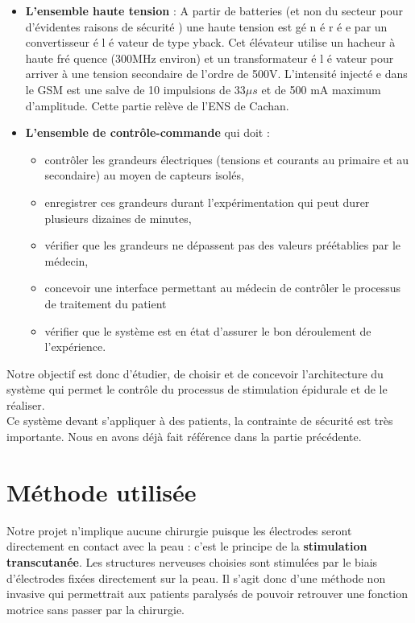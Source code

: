 \documentclass{report}
\begin{document}
\begin{itemize}
    \item \textbf{L'ensemble haute tension} : A partir de batteries (et non du secteur pour d'\'{e}videntes
raisons de s\'{e}curit\'{e} ) une haute tension est g\'{e} n \'{e} r \'{e} e par un convertisseur \'{e} l \'{e} vateur de
type yback. Cet \'{e}l\'{e}vateur utilise un hacheur \`{a} haute fr\'{e} quence (300MHz environ) et
un transformateur \'{e} l \'{e} vateur pour arriver \`{a} une tension secondaire de l'ordre de
500V. L'intensit\'{e} inject\'{e} e dans le GSM est une salve de 10 impulsions de 33$\mu s$ et de
500 mA maximum d'amplitude. Cette partie rel\`{e}ve de l'ENS de Cachan.
    
    \item \textbf{L'ensemble de contr\^{o}le-commande} qui doit :
   
    \begin{itemize}
        \item contr\^oler les grandeurs \'electriques (tensions et courants au primaire et au secondaire) au moyen de 
capteurs isol\'es,
        \item enregistrer ces grandeurs durant l'exp\'erimentation qui peut durer plusieurs dizaines de minutes,
        \item v\'erifier que les grandeurs ne d\'epassent pas des valeurs pr\'e\'etablies par le m\'edecin,
        \item concevoir une interface permettant au m\'{e}decin de contrôler le processus de traitement du patient
        \item v\'erifier que le syst\`eme est en \'etat d'assurer le bon d\'eroulement de l'exp\'erience.
    \end{itemize}
\end{itemize}

Notre objectif est donc d'\'{e}tudier, de choisir et de concevoir l'architecture du syst\`{e}me qui
permet le contrôle du processus de stimulation \'{e}pidurale et de le r\'{e}aliser.\\
Ce syst\`{e}me devant s'appliquer \`{a} des patients, la contrainte de s\'{e}curit\'{e} est tr\`{e}s importante.
Nous en avons d\'{e}j\`{a} fait r\'{e}f\'{e}rence dans la partie pr\'{e}c\'{e}dente.
    
\section{M\'{e}thode utilis\'{e}e}

Notre projet n’implique aucune chirurgie puisque les \'{e}lectrodes seront directement en
contact avec la peau : c’est le principe de la \textbf{stimulation transcutan\'{e}e}. Les structures
nerveuses choisies sont stimul\'{e}es par le biais d'\'{e}lectrodes fix\'{e}es directement sur la peau. Il
s'agit donc d’une m\'{e}thode non invasive qui permettrait aux patients paralys\'{e}s de pouvoir
retrouver une fonction motrice sans passer par la chirurgie. \\
\end{document}
